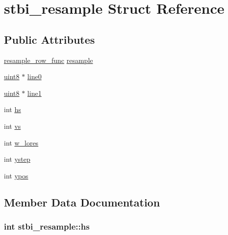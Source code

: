 \hypertarget{structstbi__resample}{}\section{stbi\+\_\+resample Struct Reference}
\label{structstbi__resample}
\subsection*{Public Attributes}
\begin{DoxyCompactItemize}
\item 
\hyperlink{stb__image_8c_aefc5d0257e3be0663f561bfc699e0d93}{resample\+\_\+row\+\_\+func} \hyperlink{structstbi__resample_a94091463ebc5933cdaf7a813025b6e19}{resample}
\item 
\hyperlink{stb__image_8c_adde6aaee8457bee49c2a92621fe22b79}{uint8} $\ast$ \hyperlink{structstbi__resample_a30c51395efffb663b183d7c64def6db3}{line0}
\item 
\hyperlink{stb__image_8c_adde6aaee8457bee49c2a92621fe22b79}{uint8} $\ast$ \hyperlink{structstbi__resample_ac1165a6da3cf652b951056667f89b1f2}{line1}
\item 
int \hyperlink{structstbi__resample_a1513390ba0102364169a52ff26d5e0f2}{hs}
\item 
int \hyperlink{structstbi__resample_a331c717f53239339c0c678f92a7bf4d5}{vs}
\item 
int \hyperlink{structstbi__resample_a41d43c7b0d6caafbf0dfa8ef064bd2a2}{w\+\_\+lores}
\item 
int \hyperlink{structstbi__resample_a0c479143447d103e73348c89f8b4ef1c}{ystep}
\item 
int \hyperlink{structstbi__resample_aa1f1ad33e739f7a38fbad8752f64f983}{ypos}
\end{DoxyCompactItemize}


\subsection{Member Data Documentation}
\hypertarget{structstbi__resample_a1513390ba0102364169a52ff26d5e0f2}{}
\subsubsection[{hs}]{\setlength{\rightskip}{0pt plus 5cm}int stbi\+\_\+resample\+::hs}\label{structstbi__resample_a1513390ba0102364169a52ff26d5e0f2}
\hypertarget{structstbi__resample_a30c51395efffb663b183d7c64def6db3}{}

